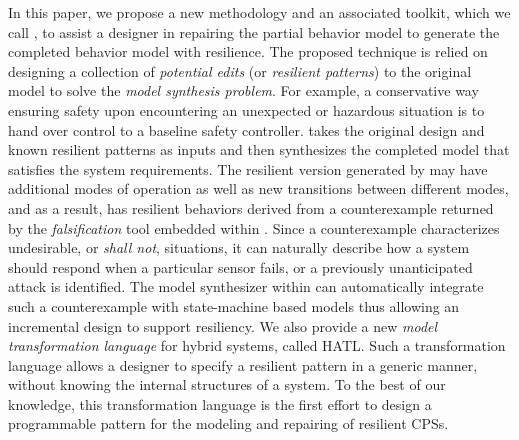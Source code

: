 In this paper, we propose a new methodology and an associated toolkit, which we call \toolreaffirm, to assist a designer in repairing the partial behavior model to generate the completed behavior model with resilience. 
%
The proposed technique is relied on designing a collection of \emph{potential edits} (or \emph{resilient patterns}) to the original model to solve the \emph{model synthesis problem}. 
%
For example, a conservative way ensuring safety upon encountering an unexpected or hazardous situation is to hand over control to a baseline safety controller.
%
\toolreaffirm takes the original design and known resilient patterns as inputs and then synthesizes the completed model that satisfies the system requirements.  
%
The resilient version generated by \toolreaffirm may have additional modes of operation as well as new transitions between different modes, and as a result, has resilient behaviors derived from a counterexample returned by the \emph{falsification} tool embedded within \toolreaffirm. 
%
Since a counterexample characterizes undesirable, or \emph{shall not}, situations, it can naturally describe how a system should respond when a particular sensor fails, or a previously unanticipated attack is identified. The model synthesizer within \toolreaffirm can automatically integrate such a counterexample with state-machine based models thus allowing an incremental design to support resiliency.
%
%
We also provide a new \emph{model transformation language} for hybrid systems, called HATL. Such a transformation language allows a designer to specify a resilient pattern in a generic manner, without knowing the internal structures of a system. To the best of our knowledge, this transformation language is the first effort to design a programmable pattern for the modeling and repairing of resilient CPSs. 


